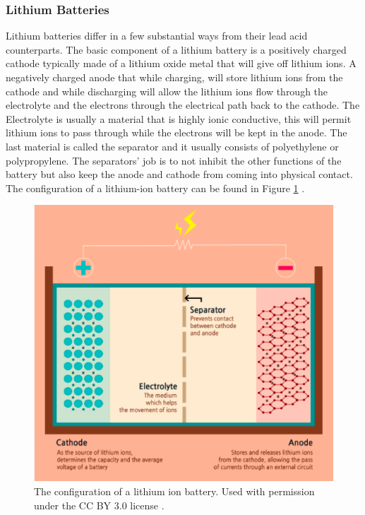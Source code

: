 \subsubsection{Lithium Batteries}
Lithium batteries differ in a few substantial ways from their lead acid counterparts. The basic component of a lithium battery is a positively charged cathode typically made of a lithium oxide metal that will give off lithium ions. A negatively charged anode that while charging, will store lithium ions from the cathode and while discharging will allow the lithium ions flow through the electrolyte and the electrons through the electrical path back to the cathode. The Electrolyte is usually a material that is highly ionic conductive, this will permit lithium ions to pass through while the electrons will be kept in the anode. The last material is called the separator and it usually consists of polyethylene or polypropylene. The separators' job is to not inhibit the other functions of the battery but also keep the anode and cathode from coming into physical contact. The configuration of a lithium-ion battery can be found in Figure \ref{lithium-ion-battery} \cite{Charging-Lithium-Ion}.

\begin{figure}
    \centering
    \includegraphics[scale=0.4]{figures/lithium ion battery.png}
    \caption{The configuration of a lithium ion battery. Used with permission under the CC BY 3.0 license \cite{lithium-batt-ref}.}
    \label{lithium-ion-battery} 
\end{figure}

